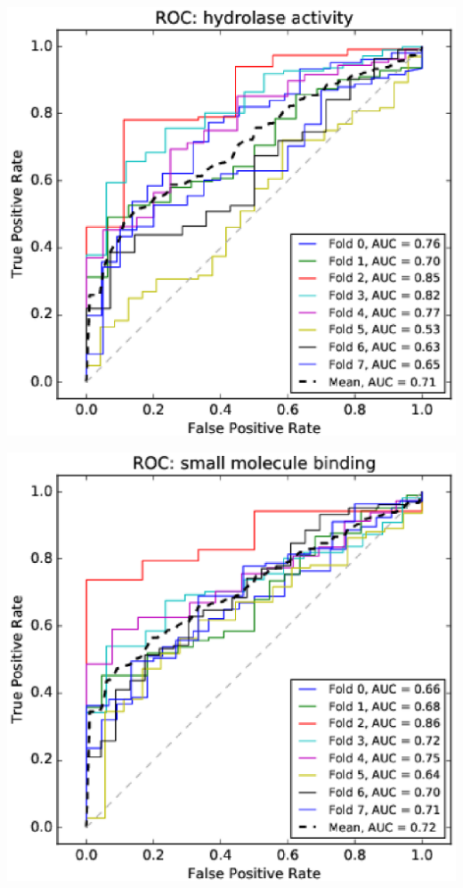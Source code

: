 \documentclass[11pt,twoside,a4paper]{book}
\newenvironment{Figure}
  {\par\medskip\noindent\minipage{\linewidth}}
  {\endminipage\par\medskip}
\begin{document}
\begin{multicols}{2}
\begin{Figure}\begin{center}\includegraphics[width=\linewidth]{figures/roc_hydrolase_activity}\label{fig:roc_hydrolase_activity}\end{center}\end{Figure}
\begin{Figure}\begin{center}\includegraphics[width=\linewidth]{figures/roc_small_molecule_binding}\label{fig:roc_small_molecule_binding}\end{center}\end{Figure}

\end{multicols}
\end{document}
